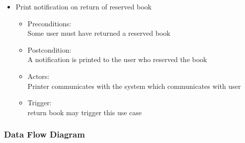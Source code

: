 \documentclass[a4paper]{article}
\begin{document}
\begin{enumerate}
\begin{itemize}
\item Print notification on return of reserved book\\ 
\begin{itemize}
\item Preconditions:\\ Some user must have returned a reserved book \\ 
 \item Postcondition:\\ A notification is printed to the user who reserved the book\\ 
 \item Actors: \\ Printer communicates with the system which communicates with user\\ 
 \item Trigger:\\ return book may trigger this use case\\ 
\end{itemize}

\end{itemize}
\end{enumerate}

\subsubsection{Data Flow Diagram}
\end{document}
